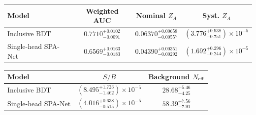 \begin{tabular}{lccc}
\toprule
Model & Weighted AUC & Nominal $Z_A$ & Syst. $Z_A$ \\
\midrule
Inclusive BDT & $0.7710^{+0.0102}_{-0.0091}$ & $0.06370^{+0.00658}_{-0.00557}$ & $(3.776^{+0.938}_{-0.751})\times10^{-5}$ \\
Single-head SPA-Net & $0.6569^{+0.0163}_{-0.0183}$ & $0.04390^{+0.00351}_{-0.00292}$ & $(1.692^{+0.296}_{-0.244})\times10^{-5}$ \\
\bottomrule
\end{tabular}
\par\smallskip
\begin{tabular}{lcc}
\toprule
Model & $S/B$ & Background $N_{\rm eff}$ \\
\midrule
Inclusive BDT & $(8.495^{+1.723}_{-1.462})\times10^{-5}$ & $28.68^{+5.46}_{-4.25}$ \\
Single-head SPA-Net & $(4.016^{+0.638}_{-0.515})\times10^{-5}$ & $58.39^{+7.56}_{-7.91}$ \\
\bottomrule
\end{tabular}
\par\medskip
